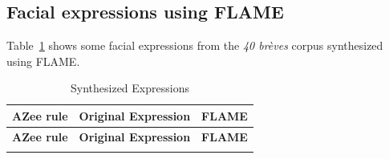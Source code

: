 \documentclass[../main.tex]{subfiles}
\begin{document}
\subsection{Facial expressions using FLAME}
\label{annex:facial_expressions:flame}

Table~\ref{tab:facial_expressions_flame} shows some facial expressions from the \emph{40 brèves} corpus synthesized using FLAME.

\begin{longtable}{|l|c|r|}
    \caption{Synthesized Expressions} \label{tab:facial_expressions_flame} \\
    \hline
    \textbf{AZee rule} & \textbf{Original Expression} & \textbf{FLAME}  \\
    \hline
    \endfirsthead

    \hline
    \textbf{AZee rule} & \textbf{Original Expression} & \textbf{FLAME} \\
    \hline
    \endhead

    \hline
    \endfoot

    \hline
    \endlastfoot


\end{longtable}
\end{document}
